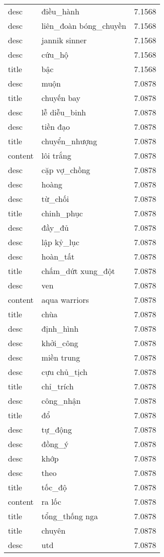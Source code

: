 \documentclass{article}
\begin{document}
\begin{tabular}{lll}
desc & điều\_hành & 7.1568\\
desc & liên\_đoàn bóng\_chuyền & 7.1568\\
desc & jannik sinner & 7.1568\\
desc & cứu\_hộ & 7.1568\\
title & bậc & 7.1568\\
desc & muộn & 7.0878\\
title & chuyến bay & 7.0878\\
desc & lễ diễu\_binh & 7.0878\\
desc & tiền đạo & 7.0878\\
title & chuyển\_nhượng & 7.0878\\
content & lôi trắng & 7.0878\\
desc & cặp vợ\_chồng & 7.0878\\
desc & hoàng & 7.0878\\
desc & từ\_chối & 7.0878\\
title & chinh\_phục & 7.0878\\
desc & đầy\_đủ & 7.0878\\
desc & lập kỷ\_lục & 7.0878\\
desc & hoàn\_tất & 7.0878\\
title & chấm\_dứt xung\_đột & 7.0878\\
desc & ven & 7.0878\\
content & aqua warriors & 7.0878\\
title & chùa & 7.0878\\
desc & định\_hình & 7.0878\\
desc & khởi\_công & 7.0878\\
desc & miền trung & 7.0878\\
desc & cựu chủ\_tịch & 7.0878\\
title & chỉ\_trích & 7.0878\\
desc & công\_nhận & 7.0878\\
title & đổ & 7.0878\\
desc & tự\_động & 7.0878\\
desc & đồng\_ý & 7.0878\\
desc & khớp & 7.0878\\
desc & theo & 7.0878\\
title & tốc\_độ & 7.0878\\
content & ra lốc & 7.0878\\
title & tổng\_thống nga & 7.0878\\
title & chuyên & 7.0878\\
desc & utd & 7.0878\\

\end{tabular}
\end{document}
